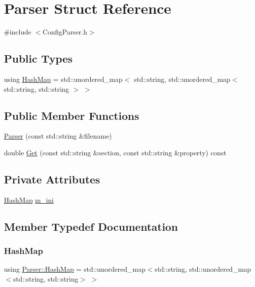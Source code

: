 \hypertarget{structParser}{}\section{Parser Struct Reference}
\label{structParser}


{\ttfamily \#include $<$Config\+Parser.\+h$>$}

\subsection*{Public Types}
\begin{DoxyCompactItemize}
\item 
using \hyperlink{structParser_ad2a004120cee6141ddb88359cf15d16b}{Hash\+Map} = std\+::unordered\+\_\+map$<$ std\+::string, std\+::unordered\+\_\+map$<$ std\+::string, std\+::string $>$ $>$
\end{DoxyCompactItemize}
\subsection*{Public Member Functions}
\begin{DoxyCompactItemize}
\item 
\hyperlink{structParser_a08b991520305d80e16724648b862abec}{Parser} (const std\+::string \&filename)
\item 
double \hyperlink{structParser_a8605ad3e2842cb575d18ea198e34440e}{Get} (const std\+::string \&section, const std\+::string \&property) const
\end{DoxyCompactItemize}
\subsection*{Private Attributes}
\begin{DoxyCompactItemize}
\item 
\hyperlink{structParser_ad2a004120cee6141ddb88359cf15d16b}{Hash\+Map} \hyperlink{structParser_a9fdee34c7149a81adc5eac9ca43da6bb}{m\+\_\+ini}
\end{DoxyCompactItemize}


\subsection{Member Typedef Documentation}
\mbox{\label{structParser_ad2a004120cee6141ddb88359cf15d16b}} 
\subsubsection{\texorpdfstring{Hash\+Map}{HashMap}}
{\footnotesize\ttfamily using \hyperlink{structParser_ad2a004120cee6141ddb88359cf15d16b}{Parser\+::\+Hash\+Map} =  std\+::unordered\+\_\+map$<$std\+::string, std\+::unordered\+\_\+map$<$std\+::string, std\+::string$>$ $>$}



